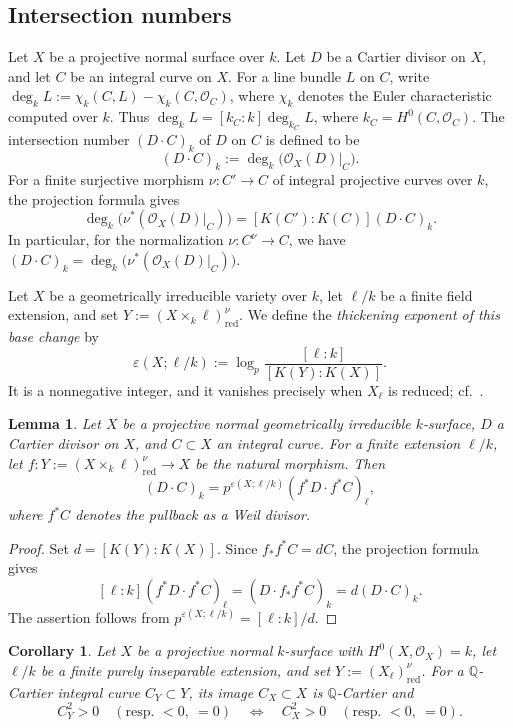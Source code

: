 \documentclass[10pt,abstract=true]{scrartcl}
\numberwithin{equation}{section}
\newtheorem{lemma}[theorem]{Lemma}
\newtheorem{corollary}[theorem]{Corollary}
\theoremstyle{definition}
\theoremstyle{remark}
\begin{document}
\subsection{Intersection numbers}\label{sec:intersection-numbers}%
  Let $X$ be a projective normal surface over $k$.
  Let $D$ be a Cartier divisor on $X$, and let $C$ be an integral curve on $X$.
  For a line bundle $L$ on $C$, write $\deg_k L := \chi_k(C,L)-\chi_k(C,\mathcal O_C)$, where $\chi_k$ denotes the Euler characteristic computed over $k$.
  Thus $\deg_k L=[k_C:k]\deg_{k_C}L$, where $k_C=H^0(C,\mathcal O_C)$.
  The intersection number $(D\cdot C)_k$ of $D$ on $C$ is defined to be
  \[
    (D\cdot C)_k := \deg_k\bigl(\mathcal O_X(D)|_C\bigr).
  \]
  For a finite surjective morphism $\nu\colon C'\to C$ of integral projective curves over $k$, the projection formula gives
  \[
    \deg_k\bigl(\nu^*(\mathcal O_X(D)|_C)\bigr)
    = [K(C'):K(C)](D\cdot C)_k.
  \]
  In particular, for the normalization $\nu\colon C^\nu\to C$, we have $(D\cdot C)_k=\deg_k\bigl(\nu^*(\mathcal O_X(D)|_C)\bigr)$.
  \medskip

Let $X$ be a geometrically irreducible variety over $k$, let $\ell/k$ be a finite field extension, and set $Y:=(X\times_k\ell)_{\mathrm{red}}^\nu$.
We define the \emph{thickening exponent of this base change} by
\[
  \varepsilon(X;\ell/k)
  :=\log_p\frac{[\ell:k]}{[K(Y):K(X)]}.
\]
It is a nonnegative integer, and it vanishes precisely when $X_\ell$ is reduced; cf.~\cite[Theorem~7.3\textup{(1)--(2)}]{tanaka_invariants_2021}.

\begin{lemma}\label{lemm:intersection-field-extension}%
  Let $X$ be a projective normal geometrically irreducible $k$-surface, $D$ a Cartier divisor on $X$, and $C\subset X$ an integral curve.
  For a finite extension $\ell/k$, let $f\colon Y:=(X\times_k\ell)_{\mathrm{red}}^\nu\to X$ be the natural morphism.
  Then
  \[
    (D\cdot C)_k
    =p^{\varepsilon(X;\ell/k)}(f^*D\cdot f^*C)_\ell,
  \]
  where $f^*C$ denotes the pullback as a Weil divisor.
\end{lemma}
\begin{proof}
  Set $d=[K(Y):K(X)]$.
  Since $f_*f^*C=dC$, the projection formula gives
  \[
    [\ell:k](f^*D\cdot f^*C)_\ell
    =(D\cdot f_*f^*C)_k
    =d(D\cdot C)_k.
  \]
  The assertion follows from $p^{\varepsilon(X;\ell/k)}=[\ell:k]/d$.
\end{proof}

\begin{corollary}\label{cor:self-intersection-insep}%
  Let $X$ be a projective normal $k$-surface with $H^0(X,\mathcal O_X)=k$, let $\ell/k$ be a finite purely inseparable extension, and set $Y:=(X_\ell)_{\mathrm{red}}^\nu$.
  For a $\mathbb Q$-Cartier integral curve $C_Y\subset Y$, its image $C_X\subset X$ is $\mathbb Q$-Cartier and
  \[
    C_Y^2>0\quad(\text{resp. }<0,\ =0)
    \quad\Longleftrightarrow\quad
    C_X^2>0\quad(\text{resp. }<0,\ =0).
  \]
\end{corollary}
\end{document}
